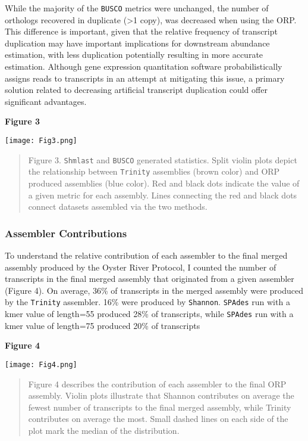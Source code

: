 \documentclass[10pt,letterpaper]{article}
\providecommand{\DIFaddbegin}{} %
\providecommand{\DIFaddend}{} %
\providecommand{\DIFdelbegin}{} %
\providecommand{\DIFdelend}{} %
\newcommand{\DIFscaledelfig}{0.5}
\newlength{\DIFdelgraphicswidth} %
\newlength{\DIFdelgraphicsheight} %
\newcommand{\DIFaddincludegraphics}[2][]{{\color{blue}\fbox{\DIFOincludegraphics[#1]{#2}}}} %
\newcommand{\DIFdelincludegraphics}[2][]{%
\sbox{\DIFdelgraphicsbox}{\DIFOincludegraphics[#1]{#2}}%
\settoboxwidth{\DIFdelgraphicswidth}{\DIFdelgraphicsbox} %
\settoboxtotalheight{\DIFdelgraphicsheight}{\DIFdelgraphicsbox} %
\scalebox{\DIFscaledelfig}{%
\parbox[b]{\DIFdelgraphicswidth}{\usebox{\DIFdelgraphicsbox}\\[-\baselineskip] \rule{\DIFdelgraphicswidth}{0em}}\llap{\resizebox{\DIFdelgraphicswidth}{\DIFdelgraphicsheight}{%
\setlength{\unitlength}{\DIFdelgraphicswidth}%
\begin{picture}(1,1)%
\thicklines\linethickness{2pt} %
{\color[rgb]{1,0,0}\put(0,0){\framebox(1,1){}}}%
{\color[rgb]{1,0,0}\put(0,0){\line( 1,1){1}}}%
{\color[rgb]{1,0,0}\put(0,1){\line(1,-1){1}}}%
\end{picture}%
}\hspace*{3pt}}} %
} %
\DeclareRobustCommand{\DIFaddbegin}{\DIFOaddbegin \let\includegraphics\DIFaddincludegraphics} %
\DeclareRobustCommand{\DIFaddend}{\DIFOaddend \let\includegraphics\DIFOincludegraphics} %
\DeclareRobustCommand{\DIFdelbegin}{\DIFOdelbegin \let\includegraphics\DIFdelincludegraphics} %
\DeclareRobustCommand{\DIFdelend}{\DIFOaddend \let\includegraphics\DIFOincludegraphics} %
\begin{document}
While the majority of the \texttt{BUSCO} metrics were unchanged, the number of orthologs recovered in duplicate (\textgreater 1 copy), was decreased when using the ORP. This difference is important, given that the relative frequency of transcript duplication may have important implications for downstream abundance estimation, with less  duplication potentially resulting in more accurate estimation. Although gene expression quantitation software \citep{Patro:2017iv,Bray:2016ee} probabilistically assigns reads to transcripts in an attempt at mitigating this issue, a primary solution related to decreasing artificial transcript duplication could offer significant advantages.


\textbf{\hypertarget{Figure 3}{Figure 3}} \\
\DIFdelbegin %
\DIFdelend \DIFaddbegin \centerline{\texttt{[image: Fig3.png]}}
\DIFaddend \begin{quote}
\small{Figure 3. \texttt{Shmlast} and \texttt{BUSCO} generated statistics. Split violin plots depict the relationship between \texttt{Trinity} assemblies (brown color) and ORP produced assemblies (blue color). Red and black dots indicate the value of a given metric for each assembly. Lines connecting the red and black dots connect datasets assembled via the two methods.}
\end{quote} 

\subsubsection{Assembler Contributions}

To understand the relative contribution of each assembler to the final merged assembly produced by the Oyster River Protocol, I counted the number of transcripts in the final merged assembly that originated from a given assembler (Figure 4). On average, 36\% of transcripts in the merged assembly were produced by the \texttt{Trinity} assembler. 16\% were produced by \texttt{Shannon}. \texttt{SPAdes} run with a kmer value of length=55 produced 28\% of transcripts, while \texttt{SPAdes} run with a kmer value of length=75 produced 20\% of transcripts 

\textbf{\hypertarget{Figure 4}{Figure 4}} \\
\centerline{\texttt{[image: Fig4.png]}}
\begin{quote}
\DIFdelbegin %
\DIFdelend \DIFaddbegin \small{Figure 4 describes the contribution of each assembler to the final ORP assembly. Violin plots illustrate that Shannon contributes on average the fewest number of transcripts to the final merged assembly, while Trinity contributes on average the most. Small dashed lines on each side of the plot mark the median of the distribution. }
\DIFaddend \end{quote} 
\end{document}
